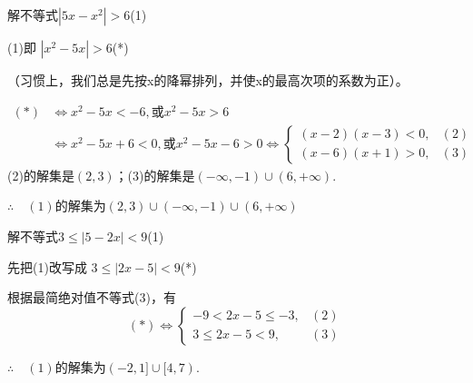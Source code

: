 \begin{figure}[htp]
    \centering
{}
    \caption{}
\end{figure}

\begin{example}
    解不等式$|5x-x^2|>6$\hfill (1)
\end{example}

\begin{solution}
(1)即 $|x^2-5x|>6$\hfill (*)

（习惯上，我们总是先按x的降幂排列，并使x的最高次项的系数为正）。

\[\begin{split}
    (*)&\Longleftrightarrow x^2-5x<-6,\text{或}x^2-5x>6 \\
    &\Longleftrightarrow x^2-5x+6<0,\text{或}x^2-5x-6>0\Longleftrightarrow \begin{cases}
        (x-2)(x-3)<0,& (2)\\
        (x-6)(x+1)>0,& (3)
    \end{cases}
\end{split} \]
(2)的解集是$(2,3)$；(3)的解集是$(-\infty,-1)\cup (6,+\infty)$.

$\therefore\quad (1)$的解集为$(2,3)\cup (-\infty,-1)\cup (6,+\infty)$
\end{solution}

\begin{example}
    解不等式$3\le |5-2x|<9$\hfill (1)
\end{example}

\begin{solution}
先把(1)改写成 $3\le |2x-5|<9$\hfill (*)

根据最简绝对值不等式(3)，有
\[(*)\Longleftrightarrow \begin{cases}
    -9< 2x-5\le -3,& (2)\\
    3\le 2x-5<9,&(3)
\end{cases}\]

$\therefore\quad (1)$的解集为$(-2,1]\cup[4,7)$.
\end{solution}

